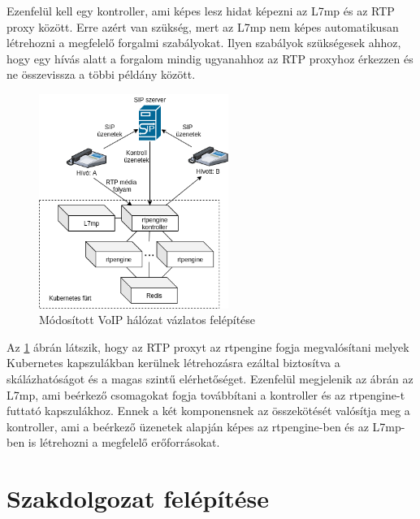 Ezenfelül kell egy kontroller, ami képes lesz hidat képezni az L7mp és az RTP proxy 
között. Erre azért van szükség, mert az L7mp nem képes automatikusan létrehozni a 
megfelelő forgalmi szabályokat. Ilyen szabályok szükségesek ahhoz, hogy egy hívás alatt a 
forgalom mindig ugyanahhoz az RTP proxyhoz érkezzen és ne összevissza a többi példány 
között.  

\begin{figure}[H]
	\centering
	\includegraphics[width=0.55\textwidth,keepaspectratio]{figures/extended_traditional_voip.png}
	\caption{Módosított VoIP hálózat vázlatos felépítése}
	\label{fig:extVoIP}
\end{figure}

Az \ref{fig:extVoIP} ábrán látszik, hogy az RTP proxyt az rtpengine fogja megvalósítani
melyek Kubernetes kapszulákban kerülnek létrehozásra ezáltal biztosítva a skálázhatóságot
és a magas szintű elérhetőséget. Ezenfelül megjelenik az ábrán az L7mp, ami beérkező 
csomagokat fogja továbbítani a kontroller és az rtpengine-t futtató kapszulákhoz. Ennek
a két komponensnek az összekötését valósítja meg a kontroller, ami a beérkező üzenetek 
alapján képes az rtpengine-ben és az L7mp-ben is létrehozni a megfelelő erőforrásokat.  

\section{Szakdolgozat felépítése}


